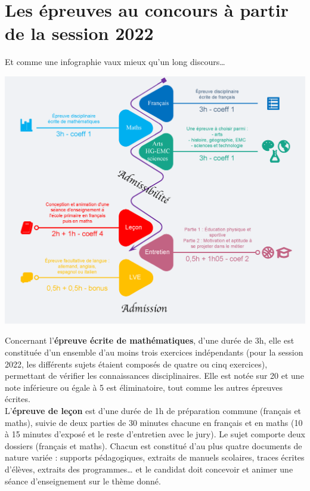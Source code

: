 \cours


\section{Les épreuves au concours à partir de la session 2022} 

Et comme une infographie vaux mieux qu'un long discours\dots
\begin{center}
   \includegraphics[width=17cm]{Transversal/Images/Tra0_cours_infographie}
\end{center}

Concernant l'{\bf épreuve écrite de mathématiques}, d'une durée de 3h, elle est constituée d'un ensemble d'au moins trois exercices indépendants (pour la session 2022, les différents sujets étaient composés de quatre ou cinq exercices), permettant de vérifier les connaissances disciplinaires. Elle est notée sur 20 et une note inférieure ou égale à 5 est éliminatoire, tout comme les autres épreuves écrites. \\

L'{\bf épreuve de leçon} est d'une durée de 1h de préparation commune (français et maths), suivie de deux parties de 30 minutes chacune en français et en maths (10 à 15 minutes d'exposé et le reste d'entretien avec le jury). Le sujet comporte deux dossiers (français et maths). Chacun est constitué d'au plus quatre documents de nature variée : supports pédagogiques, extraits de manuels scolaires, traces écrites d'élèves, extraits des programmes\dots{} et le candidat doit concevoir et animer une séance d'enseignement sur le thème donné.

